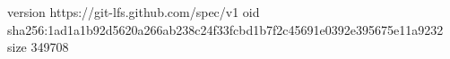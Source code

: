version https://git-lfs.github.com/spec/v1
oid sha256:1ad1a1b92d5620a266ab238c24f33fcbd1b7f2c45691e0392e395675e11a9232
size 349708
